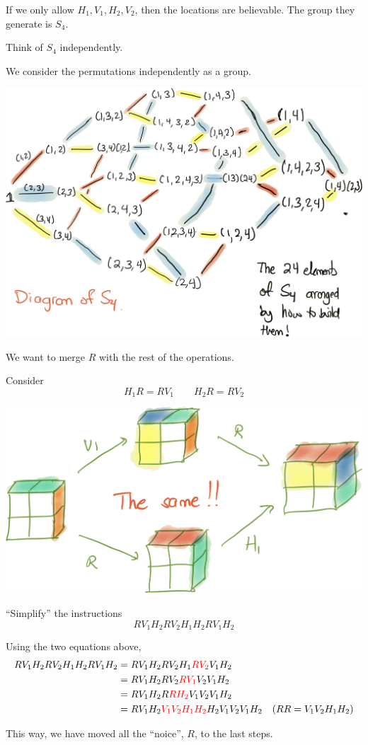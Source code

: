 If we only allow $H_1, V_1, H_2, V_2$, then the locations are believable. The group they generate is $S_4$. 

\begin{remark}
    Think of $S_4$ independently. 

    We consider the permutations independently as a group. 

    \begin{center}
        \includegraphics[width=0.55\linewidth]{figures/permutations-of-s4.png}
    \end{center}
\end{remark}

We want to merge $R$ with the rest of the operations. 

Consider \[
    H_1 R = R V_1 \qquad H_2 R = R V_2
\]

\begin{center}
    \includegraphics[width=0.45\linewidth]{figures/r-v1.png}
\end{center}

\begin{example}
    ``Simplify'' the instructions  \[
        R V_1 H_2 R V_2 H_1 H_2 R V_1 H_2
    \]

    Using the two equations above, 
    \begin{align*}
        R V_1 H_2 R V_2 H_1 H_2 R V_1 H_2
         & = R V_1 H_2 R V_2 H_1 {\color{red}R V_2} V_1 H_2             \\
         & = R V_1 H_2 R V_2 {\color{red}R V_1} V_2 V_1 H_2             \\
         & = R V_1 H_2 R {\color{red}R H_2} V_1 V_2 V_1 H_2             \\
         & = R V_1 H_2 {\color{red}V_1 V_2 H_1 H_2} H_2 V_1 V_2 V_1 H_2
         & (RR = V_1 V_2 H_1 H_2)                                       \\
    \end{align*}

    This way, we have moved all the ``noice'', $R$, to the last steps. 
\end{example}

